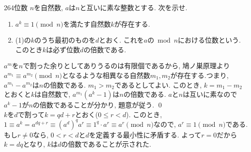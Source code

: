 \begin{prob}{264}{}{位数}
$n$を自然数, $a$は$n$と互いに素な整数とする. 次を示せ. 
\begin{enumerate} 
\item $a^k\equiv 1\pmod{n}$を満たす自然数$k$が存在する. 
\item (1)の$k$のうち最初のものを$d$とおく. これを$a$の$\bmod{n}$における位数という. このとき$k$は必ず位数$d$の倍数である.
\end{enumerate}
\end{prob}

$a^{m}$を$n$で割った余りとしてありうるのは有限個であるから, 鳩ノ巣原理より$a^{m_1}\equiv a^{m_2}\pmod{n}$となるような相異なる自然数$m_1,m_2$が存在する.つまり, $a^{m_1} - a^{m_2}$は$n$の倍数である. $m_1>m_2$であるとしてよい.  このとき, $k=m_1-m_2$とおくと$k$は自然数で, $a^{m_1}(a^{k} - 1)$は$n$の倍数である. $a$と$n$は互いに素なので$a^{k} - 1$が$n$の倍数であることが分かり, 題意が従う. \qed  \\

$k$を$d$で割って$k=qd + r$とおく($0\leq r<d$).  このとき, $1\equiv a^{k} = a^{dq + r} \equiv (a^{d})^{q} a^r\equiv 1^{q} \cdot a^{r} \equiv a^{r} \pmod{n}$なので, $a^{r} \equiv 1\pmod{n}$である. もし$r\neq 0$なら, $0< r<d$と$d$を定義する最小性に矛盾する. よって$r=0$だから$k=dq$となり, $k$は$d$の倍数であることが示された. 